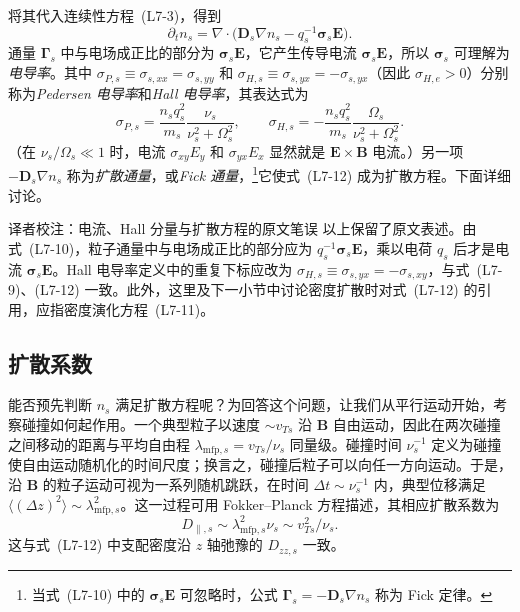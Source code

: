 将其代入连续性方程~(L7-3)，得到
\begin{equation}
\partial_tn_s=\nabla\cdot\bigl(\boldsymbol D_s\nabla n_s-q_s^{-1}\boldsymbol\sigma_s\boldsymbol E\bigr).
\tag{L7-11}\label{eq:L7:11}
\end{equation}
通量 $\boldsymbol\Gamma_s$ 中与电场成正比的部分为 $\boldsymbol\sigma_s\boldsymbol E$，它产生传导电流 $\boldsymbol\sigma_s\boldsymbol E$，所以 $\boldsymbol\sigma_s$ 可理解为\emph{电导率}。其中 $\sigma_{P,s}\equiv\sigma_{s,xx}=\sigma_{s,yy}$
和 $\sigma_{H,s}\equiv\sigma_{s,yx}=-\sigma_{s,yx}$（因此 $\sigma_{H,e}>0$）分别称为\emph{Pedersen 电导率}和\emph{Hall 电导率}，其表达式为
\begin{equation}
\sigma_{P,s}=\frac{n_sq_s^2}{m_s}\frac{\nu_s}{\nu_s^2+\Omega_s^2},
\qquad
\sigma_{H,s}=-\frac{n_sq_s^2}{m_s}\frac{\Omega_s}{\nu_s^2+\Omega_s^2}.
\tag{L7-12}\label{eq:L7:12}
\end{equation}
（在 $\nu_s/\Omega_s\ll1$ 时，电流 $\sigma_{xy}E_y$ 和 $\sigma_{yx}E_x$ 显然就是 $\boldsymbol E\times\boldsymbol B$ 电流。）另一项 $-\boldsymbol D_s\nabla n_s$ 称为\emph{扩散通量}，或\emph{Fick 通量}，\footnote{当式~(L7-10) 中的 $\boldsymbol\sigma_s\boldsymbol E$ 可忽略时，公式 $\boldsymbol\Gamma_s=-\boldsymbol D_s\nabla n_s$ 称为 Fick 定律。}它使式~(L7-12) 成为扩散方程。下面详细讨论。
\begin{correction}{译者校注：电流、Hall 分量与扩散方程的原文笔误}
以上保留了原文表述。由式~(L7-10)，粒子通量中与电场成正比的部分应为 $q_s^{-1}\boldsymbol\sigma_s\boldsymbol E$，乘以电荷 $q_s$ 后才是电流 $\boldsymbol\sigma_s\boldsymbol E$。Hall 电导率定义中的重复下标应改为 $\sigma_{H,s}\equiv\sigma_{s,yx}=-\sigma_{s,xy}$，与式~(L7-9)、(L7-12) 一致。此外，这里及下一小节中讨论密度扩散时对式~(L7-12) 的引用，应指密度演化方程~(L7-11)。
\end{correction}

\subsection{扩散系数}
能否预先判断 $n_s$ 满足扩散方程呢？为回答这个问题，让我们从平行运动开始，考察碰撞如何起作用。一个典型粒子以速度 $\sim v_{Ts}$ 沿 $\boldsymbol B$ 自由运动，因此在两次碰撞之间移动的距离与平均自由程 $\lambda_{\mathrm{mfp},s}=v_{Ts}/\nu_s$ 同量级。碰撞时间 $\nu_s^{-1}$ 定义为碰撞使自由运动随机化的时间尺度；换言之，碰撞后粒子可以向任一方向运动。于是，沿 $\boldsymbol B$ 的粒子运动可视为一系列随机跳跃，在时间 $\Delta t\sim\nu_s^{-1}$ 内，典型位移满足 $\langle(\Delta z)^2\rangle\sim\lambda_{\mathrm{mfp},s}^{2}$。这一过程可用 Fokker--Planck 方程描述，其相应扩散系数为
\begin{equation}
D_{\parallel,s}\sim\lambda_{\mathrm{mfp},s}^{2}\nu_s\sim v_{Ts}^{2}/\nu_s.
\tag{L7-13}\label{eq:L7:13}
\end{equation}
这与式~(L7-12) 中支配密度沿 $z$ 轴弛豫的 $D_{zz,s}$ 一致。

